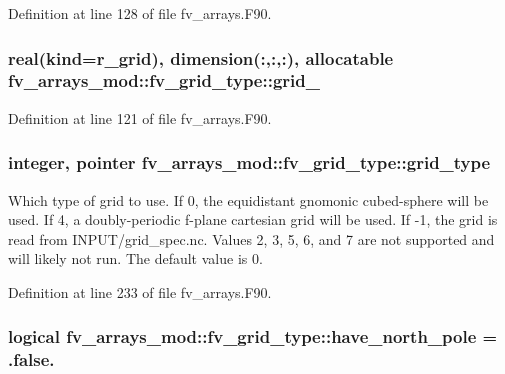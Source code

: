Definition at line 128 of file fv\-\_\-arrays.\-F90.

\subsubsection[{grid\-\_\-64}]{\setlength{\rightskip}{0pt plus 5cm}real(kind={\bf r\-\_\-grid}), dimension(\-:,\-:,\-:), allocatable fv\-\_\-arrays\-\_\-mod\-::fv\-\_\-grid\-\_\-type\-::grid\-\_}\label{structfv__arrays__mod_1_1fv__grid__type_a3e3c763e6b061f4bc4a6e01eab81780b}


Definition at line 121 of file fv\-\_\-arrays.\-F90.

\subsubsection[{grid\-\_\-type}]{\setlength{\rightskip}{0pt plus 5cm}integer, pointer fv\-\_\-arrays\-\_\-mod\-::fv\-\_\-grid\-\_\-type\-::grid\-\_\-type}\label{structfv__arrays__mod_1_1fv__grid__type_a1eb07208e873e6b397c781fe6147a083}


Which type of grid to use. If 0, the equidistant gnomonic cubed-\/sphere will be used. If 4, a doubly-\/periodic f-\/plane cartesian grid will be used. If -\/1, the grid is read from I\-N\-P\-U\-T/grid\-\_\-spec.\-nc. Values 2, 3, 5, 6, and 7 are not supported and will likely not run. The default value is 0. 



Definition at line 233 of file fv\-\_\-arrays.\-F90.

\subsubsection[{have\-\_\-north\-\_\-pole}]{\setlength{\rightskip}{0pt plus 5cm}logical fv\-\_\-arrays\-\_\-mod\-::fv\-\_\-grid\-\_\-type\-::have\-\_\-north\-\_\-pole = .false.}\label{structfv__arrays__mod_1_1fv__grid__type_a4da13b90d87079e3111543e5748ce794}


